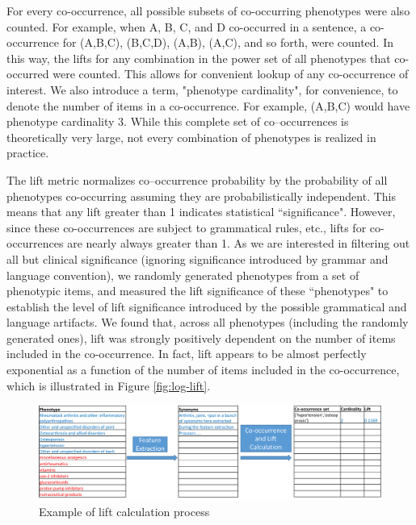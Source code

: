 \documentclass{sig-alternate-05-2015}
\begin{document}
For every co-occurrence, all possible subsets of co-occurring phenotypes were also counted.
For example, when A, B, C, and D co-occurred in a sentence, a co-occurrence for (A,B,C), (B,C,D), (A,B), (A,C), and so forth, were counted.
In this way, the lifts for any combination in the power set of all phenotypes that co-occurred were counted.
This allows for convenient lookup of any co-occurrence of interest.
We also introduce a term, "phenotype cardinality", for convenience, to denote the number of items in a co-occurrence. For example, (A,B,C) would have phenotype cardinality 3.
While this complete set of co--occurrences is theoretically very large, not every combination of phenotypes is realized in practice.

The lift metric normalizes co--occurrence probability by the probability of all phenotypes co-occurring assuming they are probabilistically independent.
This means that any lift greater than 1 indicates statistical ``significance".
However, since these co-occurrences are subject to grammatical rules, etc., lifts for co-occurrences are nearly always greater than 1.
As we are interested in filtering out all but clinical significance (ignoring significance introduced by grammar and language convention), we randomly generated phenotypes from a set of phenotypic items, and measured the lift significance of these ``phenotypes" to establish the level of lift significance introduced by the possible grammatical and language artifacts.
We found that, across all phenotypes (including the randomly generated ones), lift was strongly positively dependent on the number of items included in the co-occurrence.
In fact, lift appears to be almost perfectly exponential as a function of the number of items included in the co-occurrence, which is illustrated in Figure \ref{fig:log-lift}.

\begin{figure} [t]
\centering
\includegraphics[width=\linewidth]{lift-process-cartoon.png}
\caption{Example of lift calculation process}
\label{fig:lift-process-cartoonl}
\end{figure}
\end{document}
